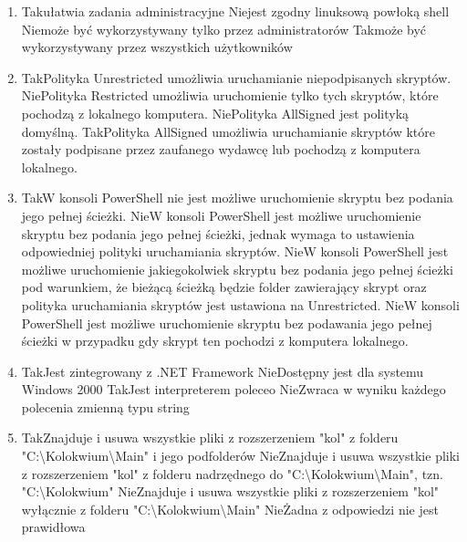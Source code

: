 \begin{enumerate}
		\newpage
		\item {}%
		{Tak}{ułatwia zadania administracyjne}%
		{Nie}{jest zgodny linuksową powłoką shell}%
		{Nie}{może być wykorzystywany tylko przez administratorów}%
		{Tak}{może być wykorzystywany przez wszystkich użytkowników}
		\item {}%
		{Tak}{Polityka Unrestricted umożliwia uruchamianie niepodpisanych skryptów.}%
		{Nie}{Polityka Restricted umożliwia uruchomienie tylko tych skryptów, które pochodzą z lokalnego komputera.}%
		{Nie}{Polityka AllSigned jest polityką domyślną.}%
		{Tak}{Polityka AllSigned umożliwia uruchamianie skryptów które zostały podpisane przez zaufanego wydawcę lub pochodzą z komputera lokalnego.}
		\item {}%
		{Tak}{W konsoli PowerShell nie jest możliwe uruchomienie skryptu bez podania jego pełnej ścieżki.}%
		{Nie}{W konsoli PowerShell jest możliwe uruchomienie skryptu bez podania jego pełnej ścieżki, jednak wymaga to ustawienia odpowiedniej polityki uruchamiania skryptów.}%
		{Nie}{W konsoli PowerShell jest możliwe uruchomienie jakiegokolwiek skryptu bez podania jego pełnej ścieżki pod warunkiem, że bieżącą ścieżką będzie folder zawierający skrypt oraz polityka uruchamiania skryptów jest ustawiona na Unrestricted.}%
		{Nie}{W konsoli PowerShell jest możliwe uruchomienie skryptu bez podawania jego pełnej ścieżki w przypadku gdy skrypt ten pochodzi z komputera lokalnego.}
		\item {}%
		{Tak}{Jest zintegrowany z .NET Framework}%
		{Nie}{Dostępny jest dla systemu Windows 2000}%
		{Tak}{Jest interpreterem poleceo}%
		{Nie}{Zwraca w wyniku każdego polecenia zmienną typu string}
		\item {}%
		{Tak}{Znajduje i usuwa wszystkie pliki z rozszerzeniem "kol" z folderu "C:\textbackslash Kolokwium\textbackslash Main" i jego podfolderów}%
		{Nie}{Znajduje i usuwa wszystkie pliki z rozszerzeniem "kol" z folderu nadrzędnego do "C:\textbackslash Kolokwium\textbackslash Main", tzn. "C:\textbackslash Kolokwium"}%
		{Nie}{Znajduje i usuwa wszystkie pliki z rozszerzeniem "kol" wyłącznie z folderu "C:\textbackslash Kolokwium\textbackslash Main"}%
		{Nie}{Żadna z odpowiedzi nie jest prawidłowa}
		

\end{enumerate}
